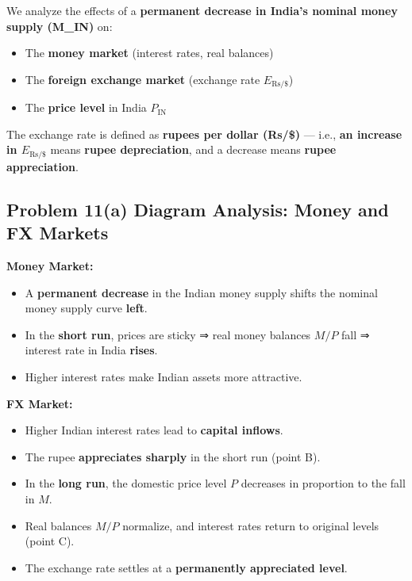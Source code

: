 \documentclass[
]{article}
\providecommand{\tightlist}{%
  \setlength{\itemsep}{0pt}\setlength{\parskip}{0pt}}
\begin{document}
We analyze the effects of a \textbf{permanent decrease in India's
nominal money supply (M\_IN)} on:

\begin{itemize}
\tightlist
\item
  The \textbf{money market} (interest rates, real balances)
\item
  The \textbf{foreign exchange market} (exchange rate
  \(E_{\text{Rs}/\$}\))
\item
  The \textbf{price level} in India \(P_{\text{IN}}\)
\end{itemize}

The exchange rate is defined as \textbf{rupees per dollar (Rs/\$)} ---
i.e., \textbf{an increase in \(E_{\text{Rs}/\$}\)} means \textbf{rupee
depreciation}, and a decrease means \textbf{rupee appreciation}.

\subsection{Problem 11(a) Diagram Analysis: Money and FX
Markets}\label{problem-11a-diagram-analysis-money-and-fx-markets}

\textbf{Money Market:}

\begin{itemize}
\tightlist
\item
  A \textbf{permanent decrease} in the Indian money supply shifts the
  nominal money supply curve \textbf{left}.
\item
  In the \textbf{short run}, prices are sticky ⇒ real money balances
  \(M/P\) fall ⇒ interest rate in India \textbf{rises}.
\item
  Higher interest rates make Indian assets more attractive.
\end{itemize}

\textbf{FX Market:}

\begin{itemize}
\tightlist
\item
  Higher Indian interest rates lead to \textbf{capital inflows}.
\item
  The rupee \textbf{appreciates sharply} in the short run (point B).
\item
  In the \textbf{long run}, the domestic price level \(P\) decreases in
  proportion to the fall in \(M\).
\item
  Real balances \(M/P\) normalize, and interest rates return to original
  levels (point C).
\item
  The exchange rate settles at a \textbf{permanently appreciated level}.
\end{itemize}
\end{document}
